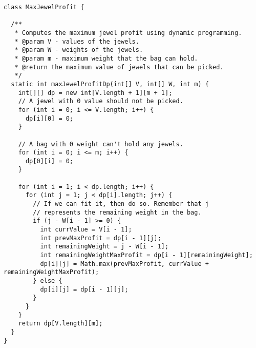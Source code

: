 \begin{lstlisting}[language=MyJava]
class MaxJewelProfit {
  
  /**
   * Computes the maximum jewel profit using dynamic programming.
   * @param V - values of the jewels.
   * @param W - weights of the jewels.
   * @param m - maximum weight that the bag can hold.
   * @return the maximum value of jewels that can be picked.
   */
  static int maxJewelProfitDp(int[] V, int[] W, int m) {
    int[][] dp = new int[V.length + 1][m + 1];
    // A jewel with 0 value should not be picked.
    for (int i = 0; i <= V.length; i++) { 
      dp[i][0] = 0; 
    }

    // A bag with 0 weight can't hold any jewels.
    for (int i = 0; i <= m; i++) { 
      dp[0][i] = 0; 
    }

    for (int i = 1; i < dp.length; i++) {
      for (int j = 1; j < dp[i].length; j++) {
        // If we can fit it, then do so. Remember that j 
        // represents the remaining weight in the bag.
        if (j - W[i - 1] >= 0) {
          int currValue = V[i - 1];
          int prevMaxProfit = dp[i - 1][j];
          int remainingWeight = j - W[i - 1];
          int remainingWeightMaxProfit = dp[i - 1][remainingWeight];
          dp[i][j] = Math.max(prevMaxProfit, currValue + remainingWeightMaxProfit);
        } else {
          dp[i][j] = dp[i - 1][j];
        }
      }
    }
    return dp[V.length][m];
  }
}
\end{lstlisting}
